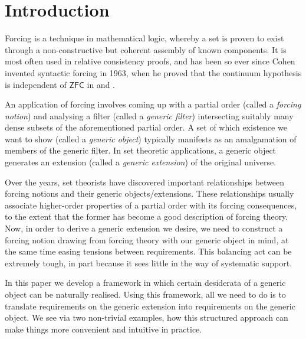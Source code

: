 \documentclass[12pt]{article}
\numberwithin{equation}{section}
\begin{document}
\newcommand{\blankpage}{
\newpage
\thispagestyle{empty}
\mbox{}
\newpage
}

{\let\clearpage\relax \tableofcontents} 

\section{Introduction}\label{sect1}

Forcing is a technique in mathematical logic, whereby a set is proven to exist through a non-constructive but coherent assembly of known components. It is most often used in relative consistency proofs, and has been so ever since Cohen invented syntactic forcing in 1963, when he proved that the continuum hypothesis is independent of $\mathsf{ZFC}$ in \cite{cohen1} and \cite{cohen2}.

An application of forcing involves coming up with a partial order (called a \emph{forcing notion}) and analysing a filter (called a \emph{generic filter}) intersecting suitably many dense subsets of the aforementioned partial order. A set of which existence we want to show (called a \emph{generic object}) typically manifests as an amalgamation of members of the generic filter. In set theoretic applications, a generic object generates an extension (called a \emph{generic extension}) of the original universe. 

Over the years, set theorists have discovered important relationships between forcing notions and their generic objects\slash extensions. These relationships usually associate higher-order properties of a partial order with its forcing consequences, to the extent that the former has become a good description of forcing theory. Now, in order to derive a generic extension we desire, we need to construct a forcing notion drawing from forcing theory with our generic object in mind, at the same time easing tensions between requirements. This balancing act can be extremely tough, in part because it sees little in the way of systematic support.

In this paper we develop a framework in which certain desiderata of a generic object can be naturally realised. Using this framework, all we need to do is to translate requirements on the generic extension into requirements on the generic object. We see via two non-trivial examples, how this structured approach can make things more convenient and intuitive in practice.
\end{document}

